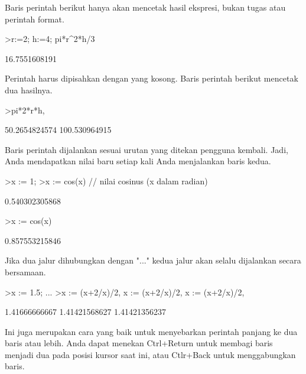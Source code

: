 \documentclass[a4paper,10pt]{article}
\begin{document}
\begin{eulernotebook}
\begin{eulercomment}
\begin{eulercomment}
\begin{eulercomment}
Baris perintah berikut hanya akan mencetak hasil ekspresi, bukan tugas
atau perintah format.
\end{eulercomment}
\begin{eulerprompt}
>r:=2; h:=4; pi*r^2*h/3
\end{eulerprompt}
\begin{euleroutput}
  16.7551608191
\end{euleroutput}
\begin{eulercomment}
Perintah harus dipisahkan dengan yang kosong. Baris perintah berikut
mencetak dua hasilnya.
\end{eulercomment}
\begin{eulerprompt}
>pi*2*r*h, %
\end{eulerprompt}
\begin{euleroutput}
  50.2654824574
  100.530964915
\end{euleroutput}
\begin{eulercomment}
Baris perintah dijalankan sesuai urutan yang ditekan pengguna kembali.
Jadi, Anda mendapatkan nilai baru setiap kali Anda menjalankan baris
kedua.
\end{eulercomment}
\begin{eulerprompt}
>x := 1;
>x := cos(x) // nilai cosinus (x dalam radian)
\end{eulerprompt}
\begin{euleroutput}
  0.540302305868
\end{euleroutput}
\begin{eulerprompt}
>x := cos(x)
\end{eulerprompt}
\begin{euleroutput}
  0.857553215846
\end{euleroutput}
\begin{eulercomment}
Jika dua jalur dihubungkan dengan "..." kedua jalur akan selalu
dijalankan secara bersamaan.
\end{eulercomment}
\begin{eulerprompt}
>x := 1.5; ...
>x := (x+2/x)/2, x := (x+2/x)/2, x := (x+2/x)/2, 
\end{eulerprompt}
\begin{euleroutput}
  1.41666666667
  1.41421568627
  1.41421356237
\end{euleroutput}
\begin{eulercomment}
Ini juga merupakan cara yang baik untuk menyebarkan perintah panjang
ke dua baris atau lebih. Anda dapat menekan Ctrl+Return untuk membagi
baris menjadi dua pada posisi kursor saat ini, atau Ctlr+Back untuk
menggabungkan baris.


\end{eulercomment}
\end{eulercomment}
\end{eulercomment}
\end{eulernotebook}
\end{document}
